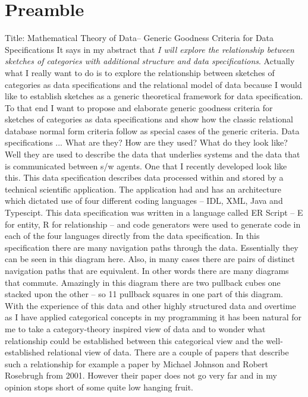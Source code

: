 \documentclass[12pt,a4paper]{article}
\theoremstyle{remark}
\begin{document}
\section{Preamble}
\note
Title: Mathematical Theory of Data-- Generic Goodness Criteria for Data Specifications
\note It says in my abstract that \textit{I will explore the relationship between sketches of categories with additional structure and data specifications}. 
Actually what I really want to do is to explore the relationship between sketches of categories as data specifications and the relational model of data
because I would like to establish sketches as a generic theoretical framework for data specification.
To that end I want to propose and elaborate  generic goodness criteria for sketches of categories as data specifications and  show how  the classic relational database normal form criteria follow as special cases of the generic criteria. 
\note
Data specifications ... What are they? How are they used? What do they look like? Well they are used to describe the data that underlies systems and the data that is communicated between s/w agents. One that I recently developed look like this.
This  data specification describes data processed within and stored by a technical scientific application. 
The application had and has  an architecture which dictated use of  four different coding languages -- IDL, XML, Java and Typescipt.  
This data specification was  written in a language called ER Script -- E for entity, R for relationship -- 
and code generators were used to generate code  in each of the four languages directly from the data specification.
\note
In this specification there are many navigation paths through the data. Essentially they can be seen in this diagram here. 
Also, in many cases there are pairs of distinct navigation paths that are equivalent. In other words there are many diagrams that commute.
\note
Amazingly in this diagram there are two pullback cubes one stacked upon the other -- so 11 pullback squares in one part of this diagram.
\note 
With the experience of this data and other highly structured data and overtime as I have applied categorical concepts in my programming 
it has been natural for me to take a category-theory inspired view of data
and to wonder what relationship could be established between this categorical view and the well-established relational view of data.
\note 
There are a couple of papers that describe such a relationship for example a paper by
Michael Johnson and Robert Rosebrugh from 2001. However their paper does not go very far and 
 in my opinion  stops short of some quite low hanging fruit.
\end{document}
